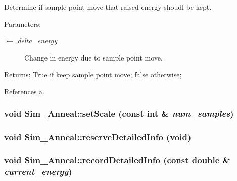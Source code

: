 Determine if sample point move that raised energy shoudl be kept. \begin{Desc}
\item[Parameters:]
\begin{description}
\item[\mbox{$\leftarrow$} {\em delta\_\-energy}]Change in energy due to sample point move. \end{description}
\end{Desc}
\begin{Desc}
\item[Returns:]True if keep sample point move; false otherwise; \end{Desc}


References a.\hypertarget{classSim__Anneal_e099bb1d6024d20d12cac05597e5b02a}{
\subsubsection[setScale]{\setlength{\rightskip}{0pt plus 5cm}void Sim\_\-Anneal::setScale (const int \& {\em num\_\-samples})}}
\label{classSim__Anneal_e099bb1d6024d20d12cac05597e5b02a}


\hypertarget{classSim__Anneal_8fefd06ac45d893bbc9b8e01c0d0fdf3}{
\subsubsection[reserveDetailedInfo]{\setlength{\rightskip}{0pt plus 5cm}void Sim\_\-Anneal::reserveDetailedInfo (void)}}
\label{classSim__Anneal_8fefd06ac45d893bbc9b8e01c0d0fdf3}


\hypertarget{classSim__Anneal_c0ed4758fe537d303240359100d7e881}{
\subsubsection[recordDetailedInfo]{\setlength{\rightskip}{0pt plus 5cm}void Sim\_\-Anneal::recordDetailedInfo (const double \& {\em current\_\-energy})}}
\label{classSim__Anneal_c0ed4758fe537d303240359100d7e881}



